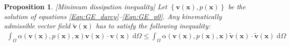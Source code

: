 \documentclass[11pt,reqno]{amsart}
\newtheorem{proposition}[theorem]{Proposition}
\begin{document}
\begin{proposition}{[Minimum dissipation inequality]}
  Let $\left\{\mathbf{v}(\mathbf{x}), p(\mathbf{x})
  \right\}$ be the solution of equations 
  \eqref{Eqn:GE_darcy}--\eqref{Eqn:GE_p0}. 
  Any kinematically admissible vector field 
  $\widetilde{\mathbf{v}}(\mathbf{x})$ has 
  to satisfy the following inequality:
  \begin{align}
    \int_{\Omega} \alpha(\mathbf{v}(\mathbf{x}),
    p(\mathbf{x}),\mathbf{x}) \mathbf{v}(\mathbf{x}) 
    \cdot \mathbf{v}(\mathbf{x}) \; \mathrm{d} \Omega \leq 
\int_{\Omega} \alpha(\mathbf{v}(\mathbf{x}),
    p(\mathbf{x}),\mathbf{x}) \widetilde{\mathbf{v}}
    (\mathbf{x}) \cdot \widetilde{\mathbf{v}}(\mathbf{x}) 
    \; \mathrm{d} \Omega 
  \end{align}
\end{proposition}
\end{document}
